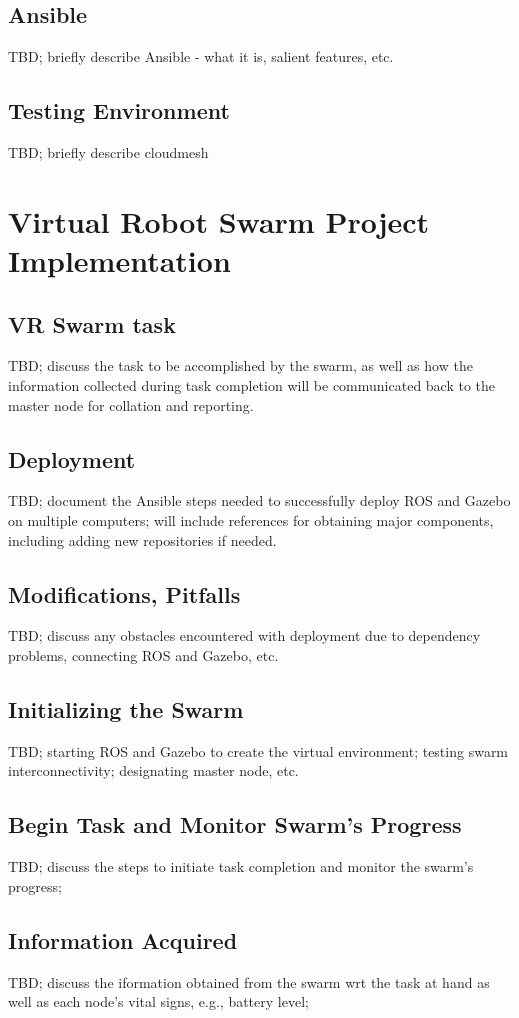 \documentclass[9pt,twocolumn,twoside]{../../styles/osajnl}
\begin{document}
\subsection{Ansible}
TBD; briefly describe Ansible - what it is, salient features, etc.
\subsection{Testing Environment}
TBD; briefly describe cloudmesh


\section{Virtual Robot Swarm Project Implementation}
\subsection{VR Swarm task}
TBD; discuss the task to be accomplished by the swarm, as well as how the information collected during task completion will be communicated back to the master node for collation and reporting.
\subsection{Deployment}
TBD; document the Ansible steps needed to successfully deploy ROS and Gazebo on multiple computers;  will include references for obtaining major components, including adding new repositories if needed.
\subsection{Modifications, Pitfalls}
TBD; discuss any obstacles encountered with deployment due to dependency problems, connecting ROS and Gazebo, etc.
\subsection{Initializing the Swarm}
TBD; starting ROS and Gazebo to create the virtual environment; testing swarm interconnectivity; designating master node, etc.
\subsection{Begin Task and Monitor Swarm's Progress}
TBD; discuss the steps to initiate task completion and monitor the swarm's progress;
\subsection{Information Acquired}
TBD; discuss the iformation obtained from the swarm wrt the task at hand as well as each node's vital signs, e.g., battery level;
\end{document}
